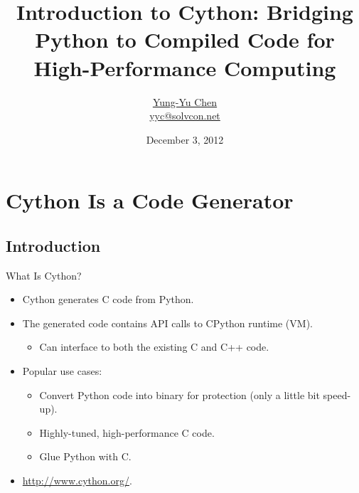 \documentclass[dvips,xcolor=pst,14pt]{beamer}
\title[Cython for HPC]{Introduction to Cython: Bridging Python to Compiled Code
for High-Performance Computing}
\author[\href{http://solvcon.net/yyc/}{Yung-Yu Chen}]%
{\href{http://solvcon.net/yyc/}{Yung-Yu Chen} \\ {\scriptsize
\url{yyc@solvcon.net}}}
\institute[PyHUG]{Python Hsinchu User Group}
\date[2012/12/3]{December 3, 2012}
\begin{document}
\begin{frame}
\titlepage
\end{frame}


\section{
Cython Is a Code Generator
}

\subsection{
Introduction
}

\begin{frame}{
%
What Is Cython?
%
}
\begin{itemize}
\item Cython generates C code from Python.
\item The generated code contains API calls to CPython runtime (VM).
\begin{itemize}
  \item Can interface to both the existing \alert{C} and \alert{C++} code.
\end{itemize}
\item Popular use cases:
\begin{itemize} \normalsize
  \item Convert Python code into binary for protection (only a little bit
  speed-up).
  \item Highly-tuned, high-performance C code.
  \item Glue Python with C.
\end{itemize}
\item \url{http://www.cython.org/}.
\end{itemize}
\end{frame}
\end{document}
